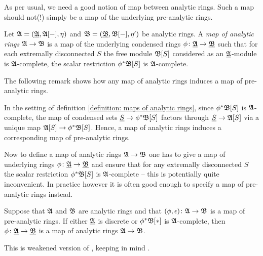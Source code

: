As per usual, we need a good notion of map between analytic rings. Such a map should not(!) simply be a map of the underlying pre-analytic rings.
\begin{definition}
	\label{definition: maps of analytic rings}
	
	Let ${\mathfrak{A}}=({\underline{{\mathfrak{A}}}}, {{{\mathfrak{A}}[-]}}, \eta)$ and ${\mathfrak{B}}=({\underline{{\mathfrak{B}}}}, {{{\mathfrak{B}}[-]}}, \eta')$ be analytic rings. A \emph{map of analytic rings} ${\mathfrak{A}}\to{\mathfrak{B}}$ is a map of the underlying condensed rings $\phi\colon {\underline{{\mathfrak{A}}}}\to {\underline{{\mathfrak{B}}}}$ such that for each extremally disconnected $S$ the free module ${{{\mathfrak{B}}[S]}}$ considered as an ${\underline{{\mathfrak{A}}}}$-module is ${\mathfrak{A}}$-complete, \ie the scalar restriction ${\phi^\ast} {{{\mathfrak{B}}[S]}}$ is ${\mathfrak{A}}$-complete.
\end{definition}

The following remark shows how any map of analytic rings induces a map of pre-analytic rings.
\begin{remark}
	\label{remark: maps of analytic rings induce maps of pre-analytic rings}
	
	In the setting of definition \ref{definition: maps of analytic rings}, since ${\phi^\ast}{{{\mathfrak{B}}[S]}}$ is ${\mathfrak{A}}$-complete, the map of condensed sets $\underline{S}\to {\phi^\ast}{{{\mathfrak{B}}[S]}}$ factors through $\underline{S}\to {{{\mathfrak{A}}[S]}}$ via a unique map ${{{\mathfrak{A}}[S]}} \to {\phi^\ast} {{{\mathfrak{B}}[S]}}$. Hence, a map of analytic rings induces a corresponding map of pre-analytic rings.
\end{remark}

Now to define a map of analytic rings ${\mathfrak{A}} \to {\mathfrak{B}}$ one has to give a map of underlying rings $\phi\colon {\underline{{\mathfrak{A}}}}\to{\underline{{\mathfrak{B}}}}$ and ensure that for any extremally disconnected $S$ the scalar restriction ${\phi^\ast}{{{\mathfrak{B}}[S]}}$ is ${\mathfrak{A}}$-complete -- this is potentially quite inconvenient. In practice however it is often good enough to specify a map of pre-analytic rings instead.
\begin{proposition}
	\label{proposition: maps of analytic rings from maps of pre-analytic rings}
	
	Suppose that ${\mathfrak{A}}$ and ${\mathfrak{B}}$ are analytic rings and that $(\phi, \epsilon)\colon {\mathfrak{A}}\to {\mathfrak{B}}$ is a map of pre-analytic rings. If either ${\underline{{\mathfrak{A}}}}$ is discrete or ${\phi^\ast}{{{\mathfrak{B}}[\ast]}}$ is ${\mathfrak{A}}$-complete, then $\phi\colon {\underline{{\mathfrak{A}}}}\to{\underline{{\mathfrak{B}}}}$ is a map of analytic rings ${\mathfrak{A}}\to{\mathfrak{B}}$.
\end{proposition}
\begin{shortproof}
	This is weakened version of \cite[Prop. 7.14]{condenseddotpdf}, keeping in mind \cite[Rem. 7.15]{condenseddotpdf}.
\end{shortproof}

